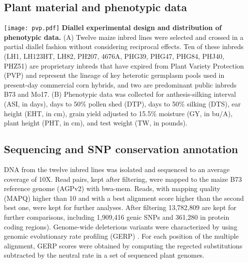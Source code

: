 \documentclass[a0,portrait]{a0poster}
\begin{document}
\begin{multicols}{2}
\subsection*{Plant material and phenotypic data}
\begin{center}\vspace{1cm}
\texttt{[image: pvp.pdf]}
{\color{black} \textbf{Diallel experimental design and distribution of phenotypic data.}
\color{Green} (A) Twelve maize inbred lines were selected and crossed in a partial diallel fashion without considering reciprocal effects. Ten of these inbreds (LH1, LH123HT, LH82, PH207, 4676A, PHG39, PHG47, PHG84, PHJ40, PHZ51) are proprietary inbreds that have expired from Plant Variety Protection (PVP) and represent the lineage of key heterotic germplasm pools used in present-day commercial corn hybrids, and two are predominant public inbreds B73 and Mo17. (B) Phenotypic data was collected for anthesis-silking interval (ASI, in days), days to 50\% pollen shed (DTP), days to 50\% silking (DTS), ear height (EHT, in cm), grain yield adjusted to 15.5\% moisture (GY, in bu/A), plant height (PHT, in cm), and test weight (TW, in pounds).
}
\end{center}\vspace{1cm}

\subsection*{Sequencing and SNP conservation annotation}
DNA from the twelve inbred lines was isolated and sequenced to an average coverage of 10X. Read pairs, kept after filtering,  were mapped to the maize B73 reference genome (AGPv2) with bwa-mem. Reads, with mapping quality (MAPQ) higher than 10 and with a best alignment score higher than the second best one, were kept for further analyses. After filtering 13,782,809 are kept for further comparisons, including 1,909,416 genic SNPs and 361,280 in protein coding regions). 
Genome-wide deleterious variants were characterized by using genomic evolutionary rate profiling (GERP) \citep{Cooper2005, Davydov2010}. For each position of the multiple alignment, GERP scores were obtained by computing the regected substitutions subtracted by the neutral rate in a set of sequenced plant genomes. 


\end{multicols}
\end{document}
